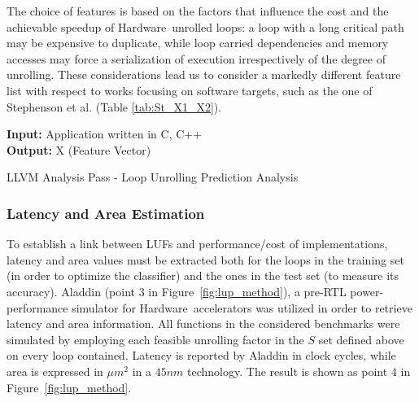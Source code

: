 \documentclass[]{usiinfthesis}
\newcommand{\HW}{{Hardware}}
\begin{document}
The choice of features is based on the factors that influence the cost
and the achievable speedup of \HW\ unrolled loops: a loop with a
long critical path may be expensive to duplicate, while loop carried
dependencies and memory accesses may force a serialization of
execution irrespectively of the degree of unrolling. These
considerations lead us to consider a markedly different feature list
with respect to works focusing on software targets, such as the one of
Stephenson et al. (Table \ref{tab:St_X1_X2}).\par

\begin{algorithm}[t]
\begin{flushleft}
\textbf{Input:}  Application written in C, C++\\
\textbf{Output:} X (Feature Vector)\\
\end{flushleft}
\begin{algorithmic}[1]
 { }
     {}
    \EndIf
  \EndFor
\EndFunction
\State
{}
   {}
   {}
\EndFunction
\end{algorithmic}
\caption{LLVM Analysis Pass - Loop Unrolling Prediction Analysis} 
\label{Algo_LLVM}

\end{algorithm}

\subsubsection{Latency and Area Estimation}

To establish a link between LUFs and performance/cost of
implementations, latency and area values must be extracted both for
the loops in the training set (in order to optimize the classifier)
and the ones in the test set (to measure its accuracy).%
Aladdin \cite{ShaoJul14} (point 3 in
Figure~\ref{fig:lup_method}), a pre-RTL power-performance simulator
for \HW\ accelerators was utilized in order to retrieve latency and area 
information. All functions in the considered benchmarks were
simulated by employing each feasible unrolling factor in the $S$ set 
defined above on every loop contained.  
Latency is reported by Aladdin in clock cycles,
while area is expressed in $\mu m^2$ in a $45nm$ technology. The
result is shown as point 4 in Figure~\ref{fig:lup_method}.
\par
\end{document}
